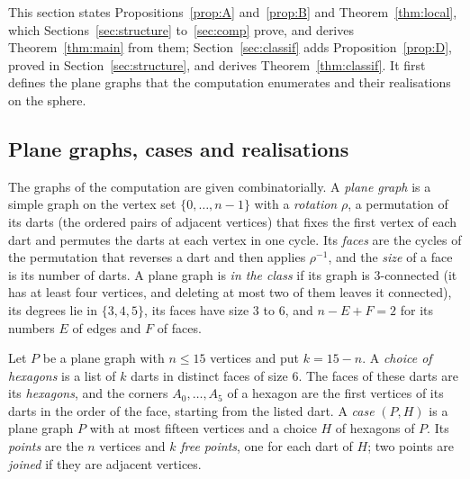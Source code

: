 \documentclass[12pt]{amsart}
\theoremstyle{definition}
\theoremstyle{plain}
\theoremstyle{definition}
\newcommand{\leanmap}[1]{\ignorespaces}
\newcommand{\mapnote}[1]{\ignorespaces}
\begin{document}
This section states Propositions~\ref{prop:A} and~\ref{prop:B} and Theorem~\ref{thm:local}, which Sections~\ref{sec:structure} to~\ref{sec:comp} prove, and derives Theorem~\ref{thm:main} from them; Section~\ref{sec:classif} adds Proposition~\ref{prop:D}, proved in Section~\ref{sec:structure}, and derives Theorem~\ref{thm:classif}. It first defines the plane graphs that the computation enumerates and their realisations on the sphere.

\subsection{Plane graphs, cases and realisations}\label{sec:cases}\leanmap{Tammes15.PlaneGraph, Tammes15.RotSys, Tammes15.RotSys.face, Tammes15.InClass, Tammes15.KConnected, Tammes15.FaceSizes, Tammes15.RotSys.Spherical, Tammes15.HexChoice, Tammes15.D2Regions.IsArcDrawing, Tammes15.D2Regions.minorArc, Tammes15.D2Regions.drawingSet, Tammes15.D2Regions.IsRegion, Tammes15.D2Regions.regionSize}\mapnote{plane graphs on the vertex set $\{0,\dots,n-1\}$, the class, the choices of hexagons as lists of darts, and the drawings with their regions}
The graphs of the computation are given combinatorially. A \emph{plane graph} is a simple graph on the vertex set $\{0,\dots,n-1\}$ with a \emph{rotation} $\rho$, a permutation of its darts (the ordered pairs of adjacent vertices) that fixes the first vertex of each dart and permutes the darts at each vertex in one cycle. Its \emph{faces} are the cycles of the permutation that reverses a dart and then applies $\rho^{-1}$, and the \emph{size} of a face is its number of darts. A plane graph is \emph{in the class} if its graph is 3-connected (it has at least four vertices, and deleting at most two of them leaves it connected), its degrees lie in $\{3,4,5\}$, its faces have size $3$ to $6$, and $n-E+F=2$ for its numbers $E$ of edges and $F$ of faces.

Let $P$ be a plane graph with $n\le15$ vertices and put $k=15-n$. A \emph{choice of hexagons} is a list of $k$ darts in distinct faces of size $6$. The faces of these darts are its \emph{hexagons}, and the corners $A_0,\dots,A_5$ of a hexagon are the first vertices of its darts in the order of the face, starting from the listed dart. A \emph{case} $(P,H)$ is a plane graph $P$ with at most fifteen vertices and a choice $H$ of hexagons of $P$. Its \emph{points} are the $n$ vertices and $k$ \emph{free points}, one for each dart of $H$; two points are \emph{joined} if they are adjacent vertices.
\end{document}
